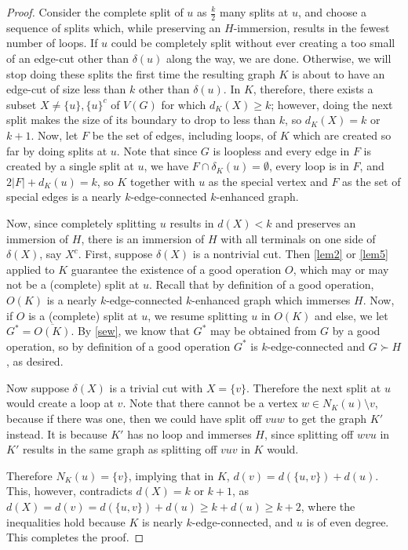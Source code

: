 \documentclass[letterpaper,11pt]{article}
\theoremstyle{definition}
\begin{document}
\begin{proof}
Consider the complete split of $u$ as $\frac{k}{2}$ many splits at $u$, and choose a sequence of splits which, while preserving an $H$-immersion, results in the fewest number of loops. If $u$ could be completely split without ever creating a too small of an edge-cut other than $\delta(u)$ along the way, we are done. Otherwise, we will stop doing these splits the first time the resulting graph $K$ is about to
have an edge-cut of size less than $k$ other than $\delta(u)$. In $K$, therefore, there exists a subset $X \neq \{u\}, \{u\}^c$ of $V(G)$ for which $d_{K}(X)\geq k $; however, doing the next split makes the size of its boundary to drop to less than $k$, so $d_{{K}}(X)=k$ or $k+1$. Now, let $F$ be the set of edges, including loops,  of $K$ which are created so far by doing splits at $u$. Note that since $G$ is loopless and every edge in $F$ is created by a single split at $u$, we have $F\cap \delta_{K}(u) = \emptyset$, every loop is in $F$, and $2|F| + d_{K}(u) = k$, so $K$ together with $u$ as the special vertex and $F$ as the set of special edges is a  nearly $k$-edge-connected  $k$-enhanced graph.


Now, since completely splitting $u$ results in $d(X)<k$ and preserves an immersion of $H$, there is an immersion of $H$ with all terminals on one side of $\delta (X)$, say $X^c$. First, suppose $\delta (X)$ is a nontrivial cut.
Then \cref{lem2} or \cref{lem5} applied to $K$ guarantee the existence of a good operation
 $O$, which may or may not be a (complete) split at $u$. Recall that by definition of a good operation, $O(K)$ is a nearly $k$-edge-connected  $k$-enhanced graph which immerses $H$. Now, if $O$ is a (complete) split at $u$, we resume splitting $u$ in $O(K)$ and else, we let $G^*= \overline{O(K)}$.  By \cref{sew}, we know that $G^*$ may be obtained from $G$ by a good operation, so by definition of a good operation $G^*$ is $k$-edge-connected and $G \succ H$, as desired.  

Now suppose $\delta(X)$ is a trivial cut with $X=\{ v \}$. Therefore the next split at $u$ would create a loop at $v$. Note that there cannot be a vertex $w \in N_{K}(u)\setminus v$, because if there was one, then we could have split off $vuw$ to get the graph $K'$ instead. It is because $K'$ has no loop and immerses $H$, since splitting off $wvu$ in $K'$ results in the same graph as splitting off $vuv$ in $K$ would.

Therefore $N_{K}(u)=\{v\}$, implying that in $K$, $d(v)=d(\{u, v\}) +d(u)$. This, however, contradicts $d(X)=k$ or $k+1$, as $d(X)=d(v)=d(\{u, v\}) +d(u)\ge k+ d(u)\ge k+2$, where the inequalities hold because $K$ is nearly $k$-edge-connected, and $u$ is of even degree. This completes the proof.
\end{proof}
\end{document}
